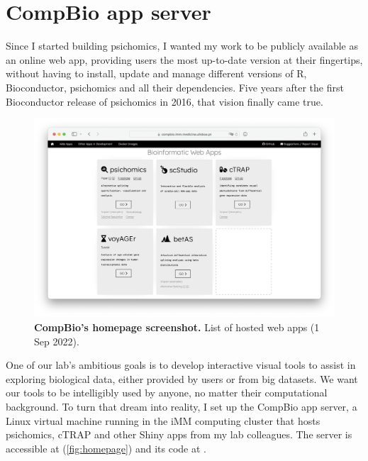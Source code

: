 \chapter{CompBio app server}
\label{chap:app-server}

Since I started building psichomics, I wanted my work to be publicly available as an online web app, providing users the most up-to-date version at their fingertips, without having to install, update and manage different versions of R, Bioconductor, psichomics and all their dependencies.
Five years after the first Bioconductor release of psichomics in 2016, that vision finally came true.

\begin{figure}[!b]
  \vspace*{-.5cm}
  \includegraphics[width=.89\textwidth]{images/app-server/homepage-2022-09-01}
  \centering
  \vspace*{-.5cm}
  \caption[Screenshot of CompBio's homepage]{\textbf{CompBio's homepage screenshot.} List of hosted web apps (1 Sep 2022).}
  \label{fig:homepage}
\end{figure}

One of our lab's ambitious goals is to develop interactive visual tools to assist in exploring biological data, either provided by users or from big datasets. We want our tools to be intelligibly used by anyone, no matter their computational background. To turn that dream into reality, I set up the CompBio app server, a Linux virtual machine running in the iMM computing cluster that hosts psichomics, cTRAP and other Shiny apps from my lab colleagues. The server is accessible at  (\autoref{fig:homepage}) and its code at .

